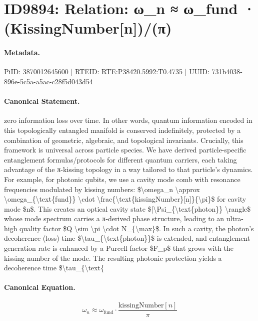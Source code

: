 \section*{ID9894: Relation: ω\_n ≈ ω\_fund · (KissingNumber[n])/(π)}
\paragraph{Metadata.}
PiID: 3870012645600 | RTEID: RTE:P38420.5992:T0.4735 | UUID: 731b4038-896e-5c5a-a5ac-c28f5d043d54

\paragraph{Canonical Statement.}
zero information loss over time. In other words, quantum information encoded in this topologically entangled manifold is conserved indefinitely, protected by a combination of geometric, algebraic, and topological invariants. Crucially, this framework is universal across particle species. We have derived particle-specific entanglement formulas/protocols for different quantum carriers, each taking advantage of the π-kissing topology in a way tailored to that particle’s dynamics. For example, for photonic qubits, we use a cavity mode comb with resonance frequencies modulated by kissing numbers: \$\textbackslash{}omega\_n \textbackslash{}approx \textbackslash{}omega\_\{\textbackslash{}text\{fund\}\} \textbackslash{}cdot \textbackslash{}frac\{\textbackslash{}text\{kissingNumber\}[n]\}\{\textbackslash{}pi\}\$ for cavity mode \$n\$. This creates an optical cavity state \$|\textbackslash{}Psi\_\{\textbackslash{}text\{photon\}\} \textbackslash{}rangle\$ whose mode spectrum carries a π-derived phase structure, leading to an ultra-high quality factor \$Q \textbackslash{}sim \textbackslash{}pi \textbackslash{}cdot N\_\{\textbackslash{}max\}\$. In such a cavity, the photon’s decoherence (loss) time \$\textbackslash{}tau\_\{\textbackslash{}text\{photon\}\}\$ is extended, and entanglement generation rate is enhanced by a Purcell factor \$F\_p\$ that grows with the kissing number of the mode. The resulting photonic protection yields a decoherence time \$\textbackslash{}tau\_\{\textbackslash{}text\{

\paragraph{Canonical Equation.}
\[
\omega_n \approx \omega_{\text{fund}} \cdot \frac{\text{kissingNumber}[n]}{\pi}
\]

